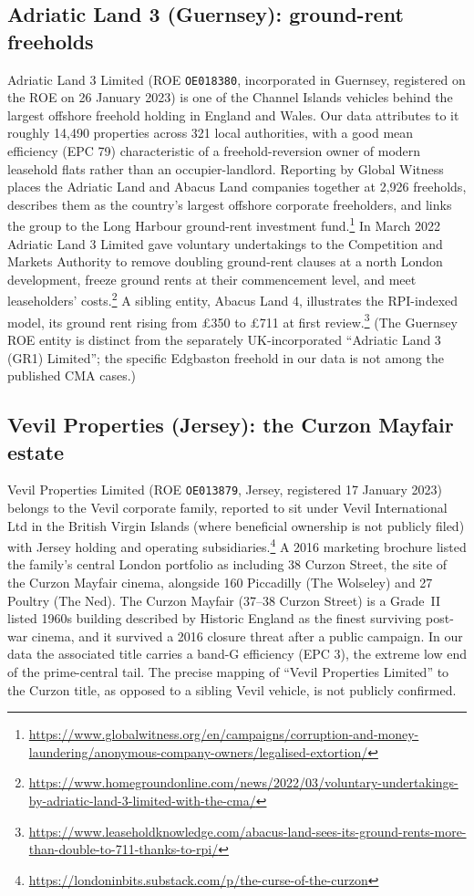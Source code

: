 \documentclass[11pt]{article}
\begin{document}
\subsection{Adriatic Land 3 (Guernsey): ground-rent freeholds}

Adriatic Land 3 Limited (ROE \texttt{OE018380}, incorporated in Guernsey,
registered on the ROE on 26 January 2023) is one of the Channel Islands vehicles
behind the largest offshore freehold holding in England and Wales. Our data
attributes to it roughly 14{,}490 properties across 321 local authorities, with a
good mean efficiency (EPC 79) characteristic of a freehold-reversion owner of
modern leasehold flats rather than an occupier-landlord. Reporting by Global
Witness places the Adriatic Land and Abacus Land companies together at 2{,}926
freeholds, describes them as the country's largest offshore corporate freeholders,
and links the group to the Long Harbour ground-rent investment
fund.\footnote{\url{https://www.globalwitness.org/en/campaigns/corruption-and-money-laundering/anonymous-company-owners/legalised-extortion/}}
In March 2022 Adriatic Land 3 Limited gave voluntary undertakings to the
Competition and Markets Authority to remove doubling ground-rent clauses at a
north London development, freeze ground rents at their commencement level, and
meet leaseholders'
costs.\footnote{\url{https://www.homegroundonline.com/news/2022/03/voluntary-undertakings-by-adriatic-land-3-limited-with-the-cma/}}
A sibling entity, Abacus Land 4, illustrates the RPI-indexed model, its ground
rent rising from \pounds{}350 to \pounds{}711 at first
review.\footnote{\url{https://www.leaseholdknowledge.com/abacus-land-sees-its-ground-rents-more-than-double-to-711-thanks-to-rpi/}}
(The Guernsey ROE entity is distinct from the separately UK-incorporated
``Adriatic Land 3 (GR1) Limited''; the specific Edgbaston freehold in our data is
not among the published CMA cases.)

\subsection{Vevil Properties (Jersey): the Curzon Mayfair estate}

Vevil Properties Limited (ROE \texttt{OE013879}, Jersey, registered 17 January
2023) belongs to the Vevil corporate family, reported to sit under Vevil
International Ltd in the British Virgin Islands (where beneficial ownership is not
publicly filed) with Jersey holding and operating
subsidiaries.\footnote{\url{https://londoninbits.substack.com/p/the-curse-of-the-curzon}}
A 2016 marketing brochure listed the family's central London portfolio as
including 38 Curzon Street, the site of the Curzon Mayfair cinema, alongside 160
Piccadilly (The Wolseley) and 27 Poultry (The Ned). The Curzon Mayfair (37--38
Curzon Street) is a Grade~II listed 1960s building described by Historic England
as the finest surviving post-war cinema, and it survived a 2016 closure threat
after a public campaign. In our data the associated title carries a band-G
efficiency (EPC 3), the extreme low end of the prime-central tail. The precise
mapping of ``Vevil Properties Limited'' to the Curzon title, as opposed to a
sibling Vevil vehicle, is not publicly confirmed.
\end{document}
